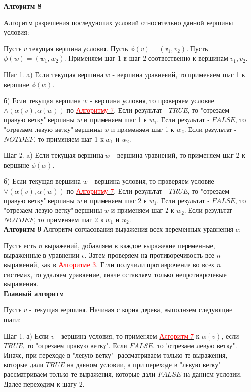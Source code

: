 \documentclass[12pt]{article}
\begin{document}
      \hypertarget{a8}{{\bf Алгоритм 8}} Алгоритм разрешения последующих условий относительно данной вершины условия:
      
       Пусть $v$ текущая вершина условия. Пусть $\phi(v)=(v_{1},v_{2})$. Пусть $\phi(w)=(w_{1},w_{2})$. Применяем шаг 1 и шаг 2 соотвественно к вершинам $v_{1},v_{2}$.
       
       Шаг 1. a) Если текущая вершина $w$ - вершина уравнений, то применяем шаг 1 к вершине $\phi(w)$. 
       
       б) Если текущая вершина $w$ - вершина условия, то проверяем условие $\wedge(\alpha(v),\alpha(w))$ по  \hyperlink{a7}{ \textcolor{red}{Алгоритму 7}}. Если результат - $TRUE$, то "отрезаем правую ветку"$\:$вершины $w$ и применяем шаг 1 к $w_{1}$. Если результат - $FALSE$, то "отрезаем левую ветку"$\:$вершины $w$ и применяем шаг 1 к $w_{2}$. Если результат - $NOTDEF$, то применяем шаг 1 к $w_{1}$ и $w_{2}$. 
       
       Шаг 2. a) Если текущая вершина $w$ - вершина уравнений, то применяем шаг 2 к вершине $\phi(w)$.
       
        б) Если текущая вершина $w$ - вершина условия, то проверяем условие $\vee(\alpha(v),\alpha(w))$ по \hyperlink{a7}{ \textcolor{red}{Алгоритму 7}}. Если результат - $TRUE$, то "отрезаем правую ветку"$\:$вершины $w$ и применяем шаг 2 к $w_{1}$. Если результат - $FALSE$, то "отрезаем левую ветку"$\:$вершины $w$ и применяем шаг 2 к $w_{2}$. Если результат - $NOTDEF$, то применяем шаг 2 к $w_{1}$ и $w_{2}$.
      \\
      
      \hypertarget{a9}{{\bf Алгоритм 9}} Алгоритм согласования выражения всех переменных уравнения $e$:
      
      Пусть есть $n$ выражений, добавляем в каждое выражение переменные, выраженные в уравнении $e$. Затем проверяем на противоречивость все $n$ выражений, как в  \hyperlink{a3}{ \textcolor{red}{Алгоритме 3}}. Если получили противрочение во всех $n$ системах, то удаляем уравнение, иначе оставляем только непротиврочевые выражения.
      \\
      
     {\bf Главный  алгоритм} 
     
     Пусть $v$ - текущая вершина.
     Начиная с корня дерева, выполняем следующие шаги:
     
     Шаг 1. а) Если $v$ - вершина условия, то применяем  \hyperlink{a7}{ \textcolor{red}{Алгоритм 7}} к  $\alpha(v)$, если $TRUE$, то "отрезаем правую ветку".  Если $FALSE$, то "отрезаем левую ветку". Иначе, при переходе в "левую ветку"$\:$ рассматриваем только те выражения, которые дали $TRUE$ на данном условии, а при переходе в "левую ветку"$\:$ рассматриваем только те выражения, которые дали $FALSE$ на данном условии. Далее переходим к шагу 2.
     
\end{document}
